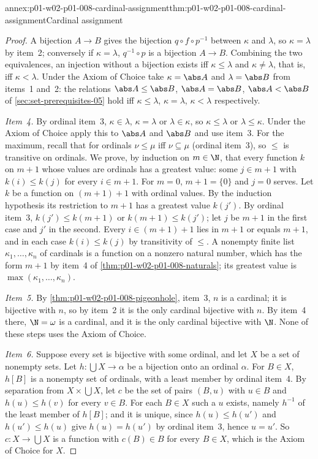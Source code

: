 \begin{annexitem}{annex:p01-w02-p01-008-cardinal-assignment}{thm:p01-w02-p01-008-cardinal-assignment}{Cardinal assignment}
\begin{proof}
A bijection \(A\to B\) gives the bijection \(q\circ f\circ p^{-1}\) between
\(\kappa\) and \(\lambda\), so \(\kappa=\lambda\) by item~2; conversely if
\(\kappa=\lambda\), \(q^{-1}\circ p\) is a bijection \(A\to B\). Combining
the two equivalences, an injection without a bijection exists iff
\(\kappa\leq\lambda\) and \(\kappa\neq\lambda\), that is, iff
\(\kappa<\lambda\). Under the Axiom of Choice take \(\kappa=\abs A\) and
\(\lambda=\abs B\) from items~1 and~2: the relations \(\abs A\leq\abs B\),
\(\abs A=\abs B\), \(\abs A<\abs B\) of \cref{sec:set-prerequisites-05}
hold iff \(\kappa\leq\lambda\), \(\kappa=\lambda\), \(\kappa<\lambda\)
respectively.

\emph{Item~4.} By ordinal item~3, \(\kappa\in\lambda\), \(\kappa=\lambda\)
or \(\lambda\in\kappa\), so \(\kappa\leq\lambda\) or \(\lambda\leq\kappa\).
Under the Axiom of Choice apply this to \(\abs A\) and \(\abs B\) and use
item~3. For the maximum, recall that for ordinals \(\nu\leq\mu\) iff
\(\nu\subseteq\mu\) (ordinal item~3), so \(\leq\) is transitive on ordinals.
We prove, by induction on \(m\in\N\), that every function \(k\) on \(m+1\)
whose values are ordinals has a greatest value: some \(j\in m+1\) with
\(k(i)\leq k(j)\) for every \(i\in m+1\). For \(m=0\), \(m+1=\{0\}\) and
\(j=0\) serves. Let \(k\) be a function on \((m+1)+1\) with ordinal values.
By the induction hypothesis its restriction to \(m+1\) has a greatest value
\(k(j')\). By ordinal item~3, \(k(j')\leq k(m+1)\) or \(k(m+1)\leq k(j')\);
let \(j\) be \(m+1\) in the first case and \(j'\) in the second. Every
\(i\in(m+1)+1\) lies in \(m+1\) or equals \(m+1\), and in each case
\(k(i)\leq k(j)\) by transitivity of \(\leq\). A nonempty finite list
\(\kappa_1,\ldots,\kappa_n\) of cardinals is a function on a nonzero
natural number, which has the form \(m+1\) by item~4 of
\cref{thm:p01-w02-p01-008-naturals}; its greatest value is
\(\max(\kappa_1,\ldots,\kappa_n)\).

\emph{Item~5.} By \cref{thm:p01-w02-p01-008-pigeonhole}, item~3, \(n\) is a
cardinal; it is bijective with \(n\), so by item~2 it is the only cardinal
bijective with \(n\). By item~4 there, \(\N=\omega\) is a cardinal, and it
is the only cardinal bijective with \(\N\). None of these steps uses the
Axiom of Choice.

\emph{Item~6.} Suppose every set is bijective with some ordinal, and let
\(X\) be a set of nonempty sets. Let \(h:\bigcup X\to\alpha\) be a bijection
onto an ordinal \(\alpha\). For \(B\in X\), \(h[B]\) is a nonempty set of
ordinals, with a least member by ordinal item~4. By separation from
\(X\times\bigcup X\), let \(c\) be the set of pairs \((B,u)\) with \(u\in B\)
and \(h(u)\leq h(v)\) for every \(v\in B\). For each \(B\in X\) such a \(u\)
exists, namely \(h^{-1}\) of the least member of \(h[B]\); and it is unique,
since \(h(u)\leq h(u')\) and \(h(u')\leq h(u)\) give \(h(u)=h(u')\) by
ordinal item~3, hence \(u=u'\). So \(c:X\to\bigcup X\) is a function with
\(c(B)\in B\) for every \(B\in X\), which is the Axiom of Choice for \(X\).
\end{proof}
\end{annexitem}
